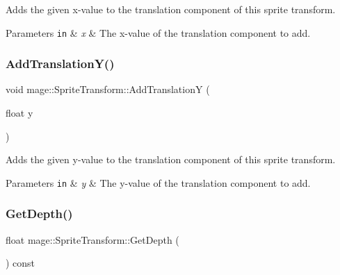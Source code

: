 Adds the given x-\/value to the translation component of this sprite transform.


\begin{DoxyParams}[1]{Parameters}
\mbox{\tt in}  & {\em x} & The x-\/value of the translation component to add. \\
\hline
\end{DoxyParams}
\hypertarget{structmage_1_1_sprite_transform_a597921469864d48d612eaba122ba4dd1}{}\label{structmage_1_1_sprite_transform_a597921469864d48d612eaba122ba4dd1} 
\subsubsection{\texorpdfstring{Add\+Translation\+Y()}{AddTranslationY()}}
{\footnotesize\ttfamily void mage\+::\+Sprite\+Transform\+::\+Add\+TranslationY (\begin{DoxyParamCaption}\item[{float}]{y }\end{DoxyParamCaption})\hspace{0.3cm}{\ttfamily [noexcept]}}

Adds the given y-\/value to the translation component of this sprite transform.


\begin{DoxyParams}[1]{Parameters}
\mbox{\tt in}  & {\em y} & The y-\/value of the translation component to add. \\
\hline
\end{DoxyParams}
\hypertarget{structmage_1_1_sprite_transform_ab1338e06ab2f073387675a9f1adbfd10}{}\label{structmage_1_1_sprite_transform_ab1338e06ab2f073387675a9f1adbfd10} 
\subsubsection{\texorpdfstring{Get\+Depth()}{GetDepth()}}
{\footnotesize\ttfamily float mage\+::\+Sprite\+Transform\+::\+Get\+Depth (\begin{DoxyParamCaption}{ }\end{DoxyParamCaption}) const\hspace{0.3cm}{\ttfamily [noexcept]}}

